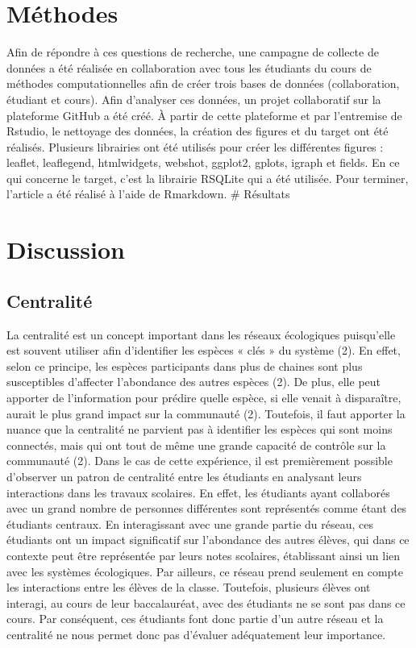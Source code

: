 \documentclass[9pt,twocolumn,twoside,]{pnas-new}
\begin{document}
\hypertarget{muxe9thodes}{%
\section{Méthodes}\label{muxe9thodes}}

Afin de répondre à ces questions de recherche, une campagne de collecte
de données a été réalisée en collaboration avec tous les étudiants du
cours de méthodes computationnelles afin de créer trois bases de données
(collaboration, étudiant et cours). Afin d'analyser ces données, un
projet collaboratif sur la plateforme GitHub a été créé. À partir de
cette plateforme et par l'entremise de Rstudio, le nettoyage des
données, la création des figures et du target ont été réalisés.
Plusieurs librairies ont été utilisés pour créer les différentes figures
: leaflet, leaflegend, htmlwidgets, webshot, ggplot2, gplots, igraph et
fields. En ce qui concerne le target, c'est la librairie RSQLite qui a
été utilisée. Pour terminer, l'article a été réalisé à l'aide de
Rmarkdown. \# Résultats

\hypertarget{discussion}{%
\section{Discussion}\label{discussion}}

\hypertarget{centralituxe9}{%
\subsection{Centralité}\label{centralituxe9}}

La centralité est un concept important dans les réseaux écologiques
puisqu'elle est souvent utiliser afin d'identifier les espèces « clés »
du système (2). En effet, selon ce principe, les espèces participants
dans plus de chaines sont plus susceptibles d'affecter l'abondance des
autres espèces (2). De plus, elle peut apporter de l'information pour
prédire quelle espèce, si elle venait à disparaître, aurait le plus
grand impact sur la communauté (2). Toutefois, il faut apporter la
nuance que la centralité ne parvient pas à identifier les espèces qui
sont moins connectés, mais qui ont tout de même une grande capacité de
contrôle sur la communauté (2). Dans le cas de cette expérience, il est
premièrement possible d'observer un patron de centralité entre les
étudiants en analysant leurs interactions dans les travaux scolaires. En
effet, les étudiants ayant collaborés avec un grand nombre de personnes
différentes sont représentés comme étant des étudiants centraux. En
interagissant avec une grande partie du réseau, ces étudiants ont un
impact significatif sur l'abondance des autres élèves, qui dans ce
contexte peut être représentée par leurs notes scolaires, établissant
ainsi un lien avec les systèmes écologiques. Par ailleurs, ce réseau
prend seulement en compte les interactions entre les élèves de la
classe. Toutefois, plusieurs élèves ont interagi, au cours de leur
baccalauréat, avec des étudiants ne se sont pas dans ce cours. Par
conséquent, ces étudiants font donc partie d'un autre réseau et la
centralité ne nous permet donc pas d'évaluer adéquatement leur
importance.
\end{document}
